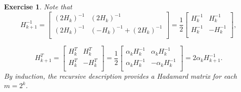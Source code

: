\documentclass[paper=a4, fontsize=11pt]{scrartcl} %
\numberwithin{equation}{section} %
\numberwithin{figure}{section} %
\numberwithin{table}{section} %
\newtheorem{exercise}{Exercise}
\numberwithin{exercise}{section}
\begin{document}
\begin{exercise}
Note that 
$$H_{k+1}^{-1}=\begin{bmatrix}
(2H_k)^{-1}  &   (2H_k)^{-1}\\
(2H_k)^{-1}  &  (-H_k)^{-1} +(2H_k)^{-1}\\
\end{bmatrix}=\frac{1}{2}\begin{bmatrix}
H_k^{-1}  &   H_k^{-1}\\
H_k^{-1}  & -H_k^{-1} \\
\end{bmatrix},$$

$$H_{k+1}^{T}=\begin{bmatrix}
H_k^{T}  &  H_k^{T} \\
H_k^{T}   &  -H_k^{T} \\
\end{bmatrix}=\frac{1}{2}\begin{bmatrix}
\alpha_k H_k^{-1}  &   \alpha_kH_k^{-1}\\
\alpha_kH_k^{-1}  & -\alpha_kH_k^{-1} \\
\end{bmatrix}=2\alpha_k H_{k+1}^{-1}.$$
By induction, the recursive description provides a Hadamard matrix for each $m=2^k$.
\end{exercise}
\end{document}
